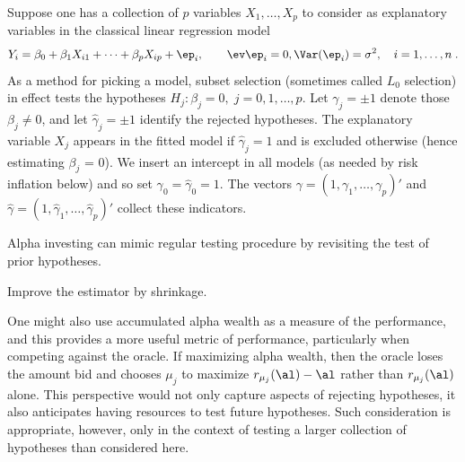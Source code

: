 \documentclass[12pt]{article}
\begin{document}
  Suppose one has a collection of $p$ variables $X_1, \ldots, X_p$ to consider as
 explanatory variables in the classical linear regression model
 \begin{equation}
   Y_i = \beta_0 + \beta_1 X_{i1} + \cdots + \beta_p X_{ip} + \ep_i, 
     \qquad \ev \ep_i = 0, \Var(\ep_i)=\sigma^2,  \quad i = 1,\ldots,n\;.
 \label{eq:regr}
 \end{equation}
 As a method for picking a model, subset selection (sometimes called $L_0$
 selection) in effect tests the hypotheses $H_j: \beta_j = 0, \; j = 0, 1, \ldots, p$.
  Let $\gamma_j = \pm 1$ denote those $\beta_j \ne 0$, and let $\hat\gamma_j =
 \pm 1$ identify the rejected hypotheses.  The explanatory variable $X_j$
 appears in the fitted model if $\hat\gamma_j = 1$ and is excluded otherwise
 (hence estimating $\beta_j$ = 0).  We insert an intercept in all models (as
 needed by risk inflation below) and so set $\gamma_0=\hat\gamma_0 = 1$.  The
 vectors $\gamma = (1, \gamma_1, \ldots, \gamma_p)'$ and $\hat\gamma = (1,
 \hat\gamma_1, \ldots, \hat\gamma_p)'$ collect these indicators.


Alpha investing can mimic regular testing procedure by revisiting the test of
prior hypotheses. 

Improve the estimator by shrinkage.



One might also use accumulated alpha wealth as a measure of the performance, and
 this provides a more useful metric of performance, particularly when competing
 against the oracle.  If maximizing alpha wealth, then the oracle loses the
 amount bid and chooses $\mu_j$ to maximize $r_{\mu_j}(\al)-\al$ rather than
 $r_{\mu_j}(\al)$ alone.  This perspective would not only capture aspects of
 rejecting hypotheses, it also anticipates having resources to test future
 hypotheses.  Such consideration is appropriate, however, only in the context of
 testing a larger collection of hypotheses than considered here.

\end{document}
